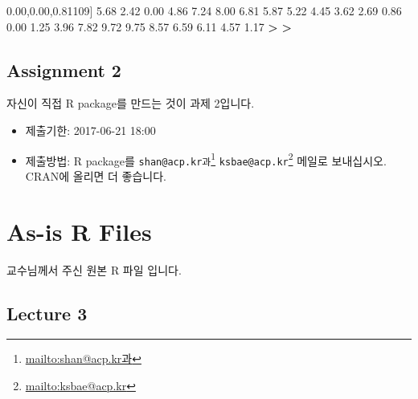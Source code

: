 \documentclass[10pt,]{krantz}
\makeatletter
\newenvironment{Shaded}{\begin{snugshade}}{\end{snugshade}}
\newcommand{\DecValTok}[1]{\textcolor[rgb]{0.00,0.00,0.81}{#1}}
\newcommand{\FloatTok}[1]{\textcolor[rgb]{0.00,0.00,0.81}{#1}}
\newcommand{\StringTok}[1]{\textcolor[rgb]{0.31,0.60,0.02}{#1}}
\newcommand{\OperatorTok}[1]{\textcolor[rgb]{0.81,0.36,0.00}{\textbf{#1}}}
\newcommand{\ErrorTok}[1]{\textcolor[rgb]{0.64,0.00,0.00}{\textbf{#1}}}
\newcommand{\NormalTok}[1]{#1}
\providecommand{\tightlist}{%
  \setlength{\itemsep}{0pt}\setlength{\parskip}{0pt}}
\renewcommand{\href}[2]{#2\footnote{\url{#1}}}
\newenvironment{kframe}{%
\medskip{}
\setlength{\fboxsep}{.8em}
 \def\at@end@of@kframe{}%
 \ifinner\ifhmode%
  \def\at@end@of@kframe{\end{minipage}}%
  \begin{minipage}{\columnwidth}%
 \fi\fi%
 \def\FrameCommand##1{\hskip\@totalleftmargin \hskip-\fboxsep
 \colorbox{shadecolor}{##1}\hskip-\fboxsep
     \hskip-\linewidth \hskip-\@totalleftmargin \hskip\columnwidth}%
 \MakeFramed {\advance\hsize-\width
   \@totalleftmargin\z@ \linewidth\hsize
   \@setminipage}}%
 {\par\unskip\endMakeFramed%
 \at@end@of@kframe}
\renewenvironment{Shaded}{\begin{kframe}}{\end{kframe}}
\makeatother
\begin{document}
\begin{Shaded}
\begin{Highlighting}[]
\NormalTok{[}\DecValTok{109}\NormalTok{]  }\FloatTok{5.68}  \FloatTok{2.42}  \FloatTok{0.00}  \FloatTok{4.86}  \FloatTok{7.24}  \FloatTok{8.00}  \FloatTok{6.81}  \FloatTok{5.87}  \FloatTok{5.22}  \FloatTok{4.45}  \FloatTok{3.62}  \FloatTok{2.69}  \FloatTok{0.86}  \FloatTok{0.00}  \FloatTok{1.25}  \FloatTok{3.96}  \FloatTok{7.82}  \FloatTok{9.72}  \FloatTok{9.75}  \FloatTok{8.57}  \FloatTok{6.59}  \FloatTok{6.11}  \FloatTok{4.57}  \FloatTok{1.17}
\OperatorTok{>}\StringTok{ }
\ErrorTok{>}\StringTok{ }
\end{Highlighting}
\end{Shaded}

\section{Assignment 2}\label{assignment-2}

자신이 직접 R package를 만드는 것이 과제 2입니다.

\begin{itemize}
\tightlist
\item
  제출기한: 2017-06-21 18:00
\item
  제출방법: R package를
  \href{mailto:shan@acp.kr과}{\nolinkurl{shan@acp.kr과}}
  \href{mailto:ksbae@acp.kr}{\nolinkurl{ksbae@acp.kr}} 메일로
  보내십시오. CRAN에 올리면 더 좋습니다.
\end{itemize}

\chapter{As-is R Files}\label{as-is-r-files}

교수님께서 주신 원본 R 파일 입니다.

\section{Lecture 3}\label{lecture-3}
\end{document}
